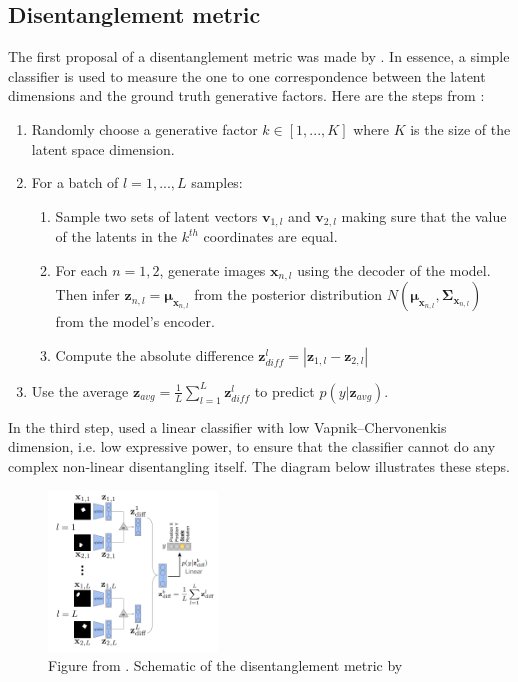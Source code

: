         \subsection{Disentanglement metric \citep{higgins2017beta}}
        The first proposal of a disentanglement metric was made by \cite{higgins2017beta}. In essence, a simple classifier is used to measure the one to one correspondence between the latent dimensions and the ground truth generative factors. Here are the steps from \cite{higgins2017beta}:
        
        \begin{enumerate}
            \item Randomly choose a generative factor $k \in [1,...,K]$ where $K$ is the size of the latent space dimension.
            \item For a batch of $l = 1,...,L$ samples:
                \begin{enumerate}
                    \item Sample two sets of latent vectors $\bm{v}_{1,l}$ and $\bm{v}_{2,l}$ making sure that the value of the latents in the $k^{th}$ coordinates are equal.
                    \item For each $n=1,2$, generate images $\bm{x}_{n,l}$ using the decoder of the model. Then infer $\bm{z}_{n,l} = \bm{\mu}_{\bm{x}_{n, l}}$ from the posterior distribution $N(\bm{\mu}_{\bm{x}_{n, l}}, \bm{\Sigma}_{\bm{x}_{n, l}})$ from the model's encoder.
                    \item Compute the absolute difference $\bm{z}_{diff}^l = | \bm{z}_{1,l} - \bm{z}_{2,l} |$
                \end{enumerate}
            \item Use the average $\bm{z}_{avg} = \frac{1}{L}\sum_{l=1}^L \bm{z}_{diff}^l$ to predict $p(y|\bm{z}_{avg})$.
        \end{enumerate}
        
        In the third step, \cite{higgins2017beta} used a linear classifier with low Vapnik–Chervonenkis dimension, i.e. low expressive power, to ensure that the classifier cannot do any complex non-linear disentangling itself. The diagram below illustrates these steps.
        
        \begin{figure}[H]
            \centering
            \includegraphics[width=0.4\textwidth]{imgs/disentanglement_metric_higgins.png}
            \caption{Figure from \cite{higgins2017beta}. Schematic of the disentanglement metric by \cite{higgins2017beta}}
            \label{fig:disentanglement_metric_higgins}
        \end{figure}
        
